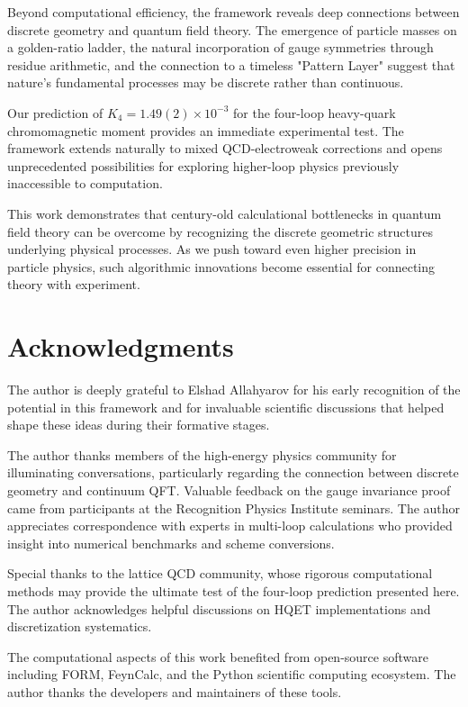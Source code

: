 \documentclass[11pt,a4paper]{article}
\theoremstyle{definition}
\theoremstyle{remark}
\begin{document}
Beyond computational efficiency, the framework reveals deep connections between discrete geometry and quantum field theory. The emergence of particle masses on a golden-ratio ladder, the natural incorporation of gauge symmetries through residue arithmetic, and the connection to a timeless "Pattern Layer" suggest that nature's fundamental processes may be discrete rather than continuous.

Our prediction of $K_4 = 1.49(2) \times 10^{-3}$ for the four-loop heavy-quark chromomagnetic moment provides an immediate experimental test. The framework extends naturally to mixed QCD-electroweak corrections and opens unprecedented possibilities for exploring higher-loop physics previously inaccessible to computation.

This work demonstrates that century-old calculational bottlenecks in quantum field theory can be overcome by recognizing the discrete geometric structures underlying physical processes. As we push toward even higher precision in particle physics, such algorithmic innovations become essential for connecting theory with experiment.

\section{Acknowledgments}

The author is deeply grateful to Elshad Allahyarov for his early recognition of the potential in this framework and for invaluable scientific discussions that helped shape these ideas during their formative stages. 

The author thanks members of the high-energy physics community for illuminating conversations, particularly regarding the connection between discrete geometry and continuum QFT. Valuable feedback on the gauge invariance proof came from participants at the Recognition Physics Institute seminars. The author appreciates correspondence with experts in multi-loop calculations who provided insight into numerical benchmarks and scheme conversions.

Special thanks to the lattice QCD community, whose rigorous computational methods may provide the ultimate test of the four-loop prediction presented here. The author acknowledges helpful discussions on HQET implementations and discretization systematics.

The computational aspects of this work benefited from open-source software including FORM, FeynCalc, and the Python scientific computing ecosystem. The author thanks the developers and maintainers of these tools.
\end{document}
